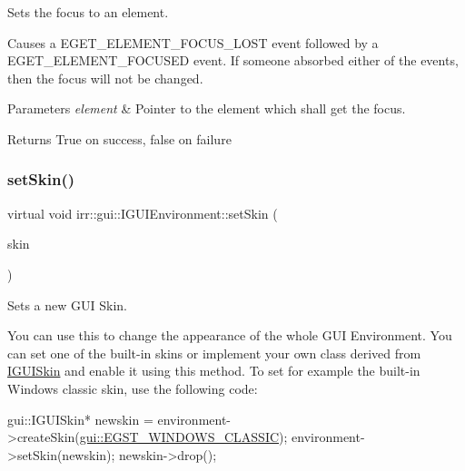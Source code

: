 Sets the focus to an element. 

Causes a E\+G\+E\+T\+\_\+\+E\+L\+E\+M\+E\+N\+T\+\_\+\+F\+O\+C\+U\+S\+\_\+\+L\+O\+ST event followed by a E\+G\+E\+T\+\_\+\+E\+L\+E\+M\+E\+N\+T\+\_\+\+F\+O\+C\+U\+S\+ED event. If someone absorbed either of the events, then the focus will not be changed. 
\begin{DoxyParams}{Parameters}
{\em element} & Pointer to the element which shall get the focus. \\
\hline
\end{DoxyParams}
\begin{DoxyReturn}{Returns}
True on success, false on failure 
\end{DoxyReturn}
\mbox{\label{classirr_1_1gui_1_1IGUIEnvironment_ae7042c520e848643e080ad4532797f23}} 
\subsubsection{\texorpdfstring{set\+Skin()}{setSkin()}}
{\footnotesize\ttfamily virtual void irr\+::gui\+::\+I\+G\+U\+I\+Environment\+::set\+Skin (\begin{DoxyParamCaption}\item[{\hyperlink{classirr_1_1gui_1_1IGUISkin}{I\+G\+U\+I\+Skin} $\ast$}]{skin }\end{DoxyParamCaption})\hspace{0.3cm}{\ttfamily [pure virtual]}}



Sets a new G\+UI Skin. 

You can use this to change the appearance of the whole G\+UI Environment. You can set one of the built-\/in skins or implement your own class derived from \hyperlink{classirr_1_1gui_1_1IGUISkin}{I\+G\+U\+I\+Skin} and enable it using this method. To set for example the built-\/in Windows classic skin, use the following code\+: 
\begin{DoxyCode}
gui::IGUISkin* newskin = environment->createSkin(\hyperlink{namespaceirr_1_1gui_a7b4619db540cbdf96e81023893b4eca5a4bc61097b84978277791e5e4b2fcfb03}{gui::EGST\_WINDOWS\_CLASSIC});
environment->setSkin(newskin);
newskin->drop();
\end{DoxyCode}
 
